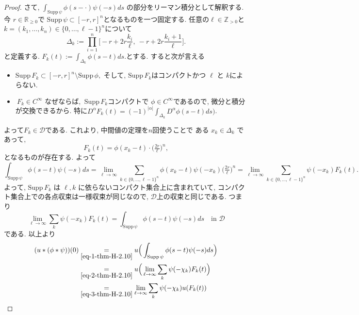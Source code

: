 \documentclass[dvipdfmx,a4paper,11pt]{article} %
\theoremstyle{definition}
\theoremstyle{remark}
\numberwithin{equation}{section}
\begin{document}
\begin{proof}
さて, \(\int_{\mathrm{Supp}\,\psi} \phi(s-\cdot)\psi(-s) ds\) の部分をリーマン積分として解釈する. 
今 \(r \in \mathbb{R}_{\geq 0}\)で \(\mathrm{Supp}\,\psi \subset [-r,r]^n\)となるものを一つ固定する. 
任意の\( \ell \in \mathbb{Z}_{>0}\)と\(k = (k_1,\ldots,k_n) \in \{0,\ldots,\ell-1\}^n\)について
\[
\Delta_k := \prod_{i=1}^n \big[-r+2r\frac{k_i}{\ell}, \ -r+2r\frac{k_i+1}{\ell}\big].
\]
と定義する.
 \(F_k(t) := \int_{\Delta_k} \phi(s-t) ds.\)とする. 
 すると次が言える
 \begin{itemize}
 \item \(\mathrm{Supp}\,F_k \subset [-r,r]^n \setminus \mathrm{Supp}\,\phi,\) そして, $\mathrm{Supp}\,F_k $はコンパクトかつ \(\ell\) と \(k\)によらない. 
 \item \( \ F_k \in C^\infty\)  なぜならば, 
\(\ \mathrm{Supp}\,F_k\)コンパクトで \(\phi \in C^\infty\)であるので, 微分と積分が交換できるから. 特に\(D^\alpha F_k(t) = (-1)^{|\alpha|} \int_{\Delta_k} D^\alpha \phi(s-t) ds \Big)\).
 \end{itemize}
よって\(F_k \in \mathcal{D}\)である.
これより, 中間値の定理を$n$回使うことで
ある \( x_k \in \Delta_k\) であって, 
\begin{equation}
\label{eq-4-thm-H-2.10}
F_k(t) = \phi(x_k - t) \cdot \Big(\tfrac{2r}{\ell}\Big)^n,
\end{equation}
となるものが存在する. よって
\begin{equation}
\label{eq-3-thm-H-2.10}
\int_{\mathrm{Supp}\,\psi} \phi(s-t)\psi(-s)ds 
= \lim_{\ell \to \infty} \sum_{k \in \{0,\ldots,\ell-1\}^n} \phi(x_k - t)\psi(-x_k)\Big(\tfrac{2r}{\ell}\Big)^n
= \lim_{\ell \to \infty} \sum_{k \in \{0,\ldots,\ell-1\}^n} \psi(-x_k) F_k(t).
\end{equation}
よって, \( \mathrm{Supp}\,F_k\) は \(\ell, k\) に依らないコンパクト集合上に含まれていて,  
コンパクト集合上での各点収束は一様収束が同じなので, $\mathcal{D}$上の収束と同じである. 
つまり 
\begin{equation}
\label{eq-2-thm-H-2.10}
\lim_{\ell \to \infty} \sum_k \psi(-x_k) F_k(t) 
= \int_{\mathrm{Supp}\,\psi} \phi(s-t)\psi(-s) ds
\quad
\text{in $\mathcal{D}$}
\end{equation}
である.
以上より
\begin{align*}
(u \ast (\phi \ast \psi))(0) 
&\underset{\eqref{eq-1-thm-H-2.10}}{=} u\Big( \int_{\mathrm{Supp}\,\psi} \phi(s-t)\psi(-s) ds \Big) \\
&\underset{\eqref{eq-2-thm-H-2.10}}{=}  u\Big( \lim_{\ell \to \infty} \sum_k \psi(-\chi_k) F_k(t) \Big) \\
&\underset{\eqref{eq-3-thm-H-2.10}}{=} \lim_{\ell \to \infty} \sum_k \psi(-\chi_k) u(F_k(t))
\end{align*}


\end{proof}
\end{document}
